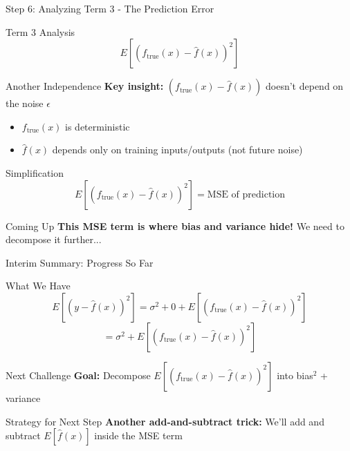 \documentclass[10pt]{beamer}
\begin{document}
\begin{frame}{Step 6: Analyzing Term 3 - The Prediction Error}
\begin{definitionbox}{Term 3 Analysis}
$$E[(f_{\text{true}}(x) - \hat{f}(x))^2]$$
\end{definitionbox}

\begin{keypointsbox}{Another Independence}
\textbf{Key insight:} $(f_{\text{true}}(x) - \hat{f}(x))$ doesn't depend on the noise $\epsilon$
\begin{itemize}
\item $f_{\text{true}}(x)$ is deterministic
\item $\hat{f}(x)$ depends only on training inputs/outputs (not future noise)
\end{itemize}
\end{keypointsbox}

\begin{examplebox}{Simplification}
$$E[(f_{\text{true}}(x) - \hat{f}(x))^2] = \text{MSE of prediction}$$
\end{examplebox}

\begin{alertbox}{Coming Up}
\textbf{This MSE term is where bias and variance hide!} We need to decompose it further...
\end{alertbox}
\end{frame}

\begin{frame}{Interim Summary: Progress So Far}
\begin{definitionbox}{What We Have}
$$E[(y - \hat{f}(x))^2] = \sigma^2 + 0 + E[(f_{\text{true}}(x) - \hat{f}(x))^2]$$
$$= \sigma^2 + E[(f_{\text{true}}(x) - \hat{f}(x))^2]$$
\end{definitionbox}

\begin{keypointsbox}{Next Challenge}
\textbf{Goal:} Decompose $E[(f_{\text{true}}(x) - \hat{f}(x))^2]$ into bias$^2$ + variance
\end{keypointsbox}

\begin{examplebox}{Strategy for Next Step}
\textbf{Another add-and-subtract trick:} We'll add and subtract $E[\hat{f}(x)]$ inside the MSE term
\end{examplebox}
\end{frame}
\end{document}
